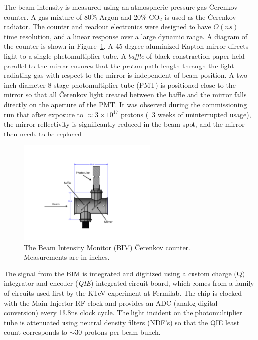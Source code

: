 The beam intensity is measured using an atmospheric pressure gas \v{C}erenkov counter. A gas mixture of 80$\%$ Argon and 20$\%$ CO$_2$ is used as the \v{C}erenkov radiator. The counter and readout electronics were designed to have $O(ns)$ time resolution, and a linear response over a large dynamic range.  A diagram of the counter is shown in Figure~\ref{fig:BIMCerenkov}.  A 45 degree aluminized Kapton mirror directs light to a single photomultiplier tube.  A \emph{baffle} of black construction paper held parallel to the mirror ensures that the proton path length through the light-radiating gas with respect to the mirror is independent of beam position. A two-inch diameter 8-stage photomultiplier tube (PMT) is positioned close to the mirror so that all \v{C}erenkov light created between the baffle and the mirror falls directly on the aperture of the PMT. It was observed during the commissioning run
that after exposure to $\approx 3 \times 10^{17}$ protons (~3 weeks of uninterrupted usage), the mirror reflectivity is significantly reduced in the beam spot, and the mirror then needs to be replaced.

\begin{figure}
	\begin{center}
		\includegraphics[width=0.6\textwidth]{figures/BIMCerenkov.pdf}
		\caption{The Beam Intensity Monitor (BIM) \v{C}erenkov counter. Measurements are in inches.}
		\label{fig:BIMCerenkov}
	\end{center}
\end{figure}

The signal from the BIM is integrated and digitized using a custom charge (Q) integrator and encoder (\emph{QIE}) integrated circuit board, which comes from a family of circuits used first by the KTeV experiment at Fermilab\cite{QIE}. The chip is clocked with the Main Injector RF clock and provides an ADC (analog-digital conversion) every 18.8ns clock cycle. The light incident on
the photomultiplier tube is attenuated using neutral density filters (NDF's) so that the QIE least count corresponds to
$\sim$30 protons per beam bunch.

